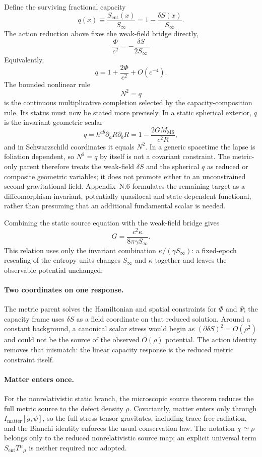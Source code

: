 \documentclass[11pt]{article}
\begin{document}
Define the surviving fractional capacity
\[
q(x)\equiv\frac{S_{\mathrm{ent}}(x)}{S_\infty}
=1-\frac{\delta S(x)}{S_\infty}.
\]
The action reduction above fixes the weak-field bridge directly,
\[
\frac{\Phi}{c^2}=-\frac{\delta S}{2S_\infty}.
\]
Equivalently,
\[
q=1+\frac{2\Phi}{c^2}+O(c^{-4}).
\]
The bounded nonlinear rule
\[
N^2=q
\]
is the continuous multiplicative completion selected by the capacity-composition rule. Its status must now be stated more precisely. In a static spherical exterior, $q$ is the invariant geometric scalar
\[
q=h^{ab}\partial_aR\partial_bR
=1-\frac{2GM_{\mathrm{MS}}}{c^2R},
\]
and in Schwarzschild coordinates it equals $N^2$. In a generic spacetime the lapse is foliation dependent, so $N^2=q$ by itself is not a covariant constraint. The metric-only parent therefore treats the weak-field $\delta S$ and the spherical $q$ as reduced or composite geometric variables; it does not promote either to an unconstrained second gravitational field.
Appendix~N.6 formulates the remaining target as a diffeomorphism-invariant, potentially quasilocal and state-dependent functional, rather than presuming that an additional fundamental scalar is needed.

Combining the static source equation with the weak-field bridge gives
\[
G=\frac{c^2\kappa}{8\pi\gamma S_\infty}.
\]
This relation uses only the invariant combination $\kappa/(\gamma S_\infty)$: a fixed-epoch rescaling of the entropy units changes $S_\infty$ and $\kappa$ together and leaves the observable potential unchanged.

\paragraph{Two coordinates on one response.}
The metric parent solves the Hamiltonian and spatial constraints for $\Phi$ and $\Psi$; the capacity frame uses $\delta S$ as a field coordinate on that reduced solution. Around a constant background, a canonical scalar stress would begin as $(\partial\delta S)^2=O(\rho^2)$ and could not be the source of the observed $O(\rho)$ potential. The action identity removes that mismatch: the linear capacity response is the reduced metric constraint itself.

\paragraph{Matter enters once.}
For the nonrelativistic static branch, the microscopic source theorem reduces the full metric source to the defect density $\rho$. Covariantly, matter enters only through $I_{\mathrm{matter}}[g,\psi]$, so the full stress tensor gravitates, including trace-free radiation, and the Bianchi identity enforces the usual conservation law. The notation $\chi\simeq\rho$ belongs only to the reduced nonrelativistic source map; an explicit universal term $S_{\mathrm{ent}}T^\mu{}_{\mu}$ is neither required nor adopted.
\end{document}
